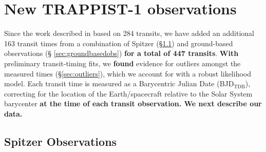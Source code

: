 \documentclass[twocolumn]{aastex63}
\begin{document}
\section{New TRAPPIST-1 observations} \label{sec:observations}

Since the work described in \citet{Grimm2018} based on 284 transits, we
have added an additional 163 transit times from a combination of Spitzer
(\S \ref{sec:spitzerobs}) and ground-based observations (\S
\ref{sec:groundbasedobs}) \textbf{for a total of 447 transits}.  
\textbf{With} preliminary transit-timing fits, we \textbf{found} evidence for outliers amongst 
the measured times (\S \ref{sec:outliers}), which we account for with a robust 
likelihood model.  Each transit time is measured as a Barycentric Julian Date 
(BJD$_\mathrm{TDB}$), correcting for the location of the Earth/spacecraft relative 
to the Solar System barycenter \citep{Eastman2010} \textbf{at the time of each
transit observation.  We next describe our data.}



\subsection{Spitzer Observations} \label{sec:spitzerobs}
\end{document}
